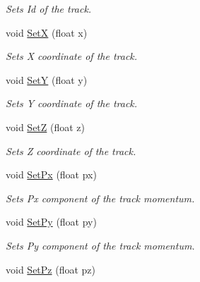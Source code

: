 \begin{DoxyCompactItemize}
\begin{DoxyCompactList}\small\item\em Sets Id of the track. \end{DoxyCompactList}\item 
void \hyperlink{classKFPTrack_a03bcf3402d7b5bd1c9f4cb716eaa62dc}{SetX} (float x)\hypertarget{classKFPTrack_a03bcf3402d7b5bd1c9f4cb716eaa62dc}{}\label{classKFPTrack_a03bcf3402d7b5bd1c9f4cb716eaa62dc}

\begin{DoxyCompactList}\small\item\em Sets X coordinate of the track. \end{DoxyCompactList}\item 
void \hyperlink{classKFPTrack_ae468ba33ada28608b1985a4115510aad}{SetY} (float y)\hypertarget{classKFPTrack_ae468ba33ada28608b1985a4115510aad}{}\label{classKFPTrack_ae468ba33ada28608b1985a4115510aad}

\begin{DoxyCompactList}\small\item\em Sets Y coordinate of the track. \end{DoxyCompactList}\item 
void \hyperlink{classKFPTrack_af74b945dba5f6889b9a2686e5284ba8e}{SetZ} (float z)\hypertarget{classKFPTrack_af74b945dba5f6889b9a2686e5284ba8e}{}\label{classKFPTrack_af74b945dba5f6889b9a2686e5284ba8e}

\begin{DoxyCompactList}\small\item\em Sets Z coordinate of the track. \end{DoxyCompactList}\item 
void \hyperlink{classKFPTrack_a5dbd5dd356267eaa55c12b43ba2533eb}{Set\+Px} (float px)\hypertarget{classKFPTrack_a5dbd5dd356267eaa55c12b43ba2533eb}{}\label{classKFPTrack_a5dbd5dd356267eaa55c12b43ba2533eb}

\begin{DoxyCompactList}\small\item\em Sets Px component of the track momentum. \end{DoxyCompactList}\item 
void \hyperlink{classKFPTrack_abf791820f24b3a23915b5b5cccd9f37d}{Set\+Py} (float py)\hypertarget{classKFPTrack_abf791820f24b3a23915b5b5cccd9f37d}{}\label{classKFPTrack_abf791820f24b3a23915b5b5cccd9f37d}

\begin{DoxyCompactList}\small\item\em Sets Py component of the track momentum. \end{DoxyCompactList}\item 
void \hyperlink{classKFPTrack_aa91b2f4354dcdfe167c82b416a26aa69}{Set\+Pz} (float pz)\hypertarget{classKFPTrack_aa91b2f4354dcdfe167c82b416a26aa69}{}\label{classKFPTrack_aa91b2f4354dcdfe167c82b416a26aa69}


\end{DoxyCompactItemize}

